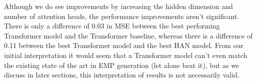 Although we do see improvements by increasing the hidden dimension and number of attention heads, the performance improvements aren't significant. There is only a difference of 0.03 in MSE between the best performing Transformer model and the Transformer baseline, whereas there is a difference of 0.11 between the best Transformer model and the best HAN model. From our initial interpretation it would seem that a Transformer model can't even match the existing state of the art in EMP generation (let alone beat it), but as we discuss in later sections, this interpretation of results is not necessarily valid. 